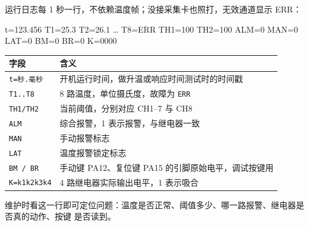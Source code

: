 \documentclass[a4paper,11pt]{ctexart}
\begin{document}
运行日志每 1 秒一行，不依赖温度帧；没接采集卡也照打，无效通道显示 ERR：
\begin{center}\small\ttfamily
t=123.456 T1=25.3 T2=26.1 \dots{} T8=ERR TH1=100 TH2=100 ALM=0 MAN=0 LAT=0 BM=0 BR=0 K=0000
\end{center}
\renewcommand{\arraystretch}{1.3}
\begin{center}
\begin{tabular}{|l|L{9.2cm}|}
\hline
字段 & 含义\\
\hline
\texttt{t=秒.毫秒} & 开机运行时间，做升温或响应时间测试时的时间戳\\
\hline
\texttt{T1..T8} & 8 路温度，单位摄氏度，故障为 \texttt{ERR}\\
\hline
\texttt{TH1/TH2} & 当前阈值，分别对应 CH1--7 与 CH8\\
\hline
\texttt{ALM} & 综合报警，1 表示报警，与继电器一致\\
\hline
\texttt{MAN} & 手动报警标志\\
\hline
\texttt{LAT} & 温度报警锁定标志\\
\hline
\texttt{BM / BR} & 手动键 PA12、复位键 PA15 的引脚原始电平，调试按键用\\
\hline
\texttt{K=k1k2k3k4} & 4 路继电器实际输出电平，1 表示吸合\\
\hline
\end{tabular}
\end{center}
\renewcommand{\arraystretch}{1.0}
维护时看这一行即可定位问题：温度是否正常、阈值多少、哪一路报警、继电器是否真的动作、按键
是否读到。

\end{document}
